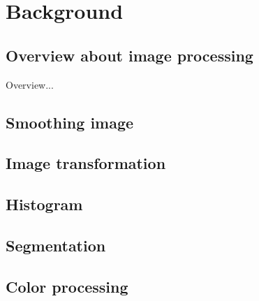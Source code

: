 \chapter{Background}
\section{Overview about image processing}
Overview...
\section{Smoothing image}
\section{Image transformation}
\section{Histogram}
\section{Segmentation}
\section{Color processing}

